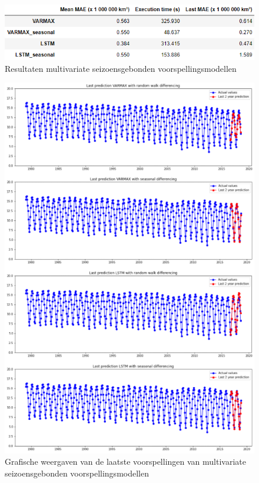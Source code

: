 \begin{figure}[!h]
    \centering
    \caption{Resultaten multivariate seizoensgebonden voorspellingsmodellen}
    \label{fig:mvsresults}
    \includegraphics[width=0.9\linewidth]{mv_s_results}
\end{figure}


\begin{figure}[!h]
    \centering
    \caption{Grafische weergaven van de laatste voorspellingen van multivariate seizoensgebonden voorspellingsmodellen}
    \label{fig:mvsresultsgraphs}
    \includegraphics[width=1\linewidth]{mv_s_results_graphs}
\end{figure}

